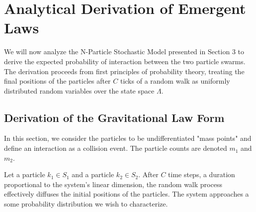 \documentclass[11pt, letterpaper]{article}
\begin{document}

\section{Analytical Derivation of Emergent Laws}

We will now analyze the N-Particle Stochastic Model presented in Section 3 to derive the expected probability of interaction between the two particle swarms. The derivation proceeds from first principles of probability theory, treating the final positions of the particles after $C$ ticks of a random walk as uniformly distributed random variables over the state space $\Lambda$.

\subsection{Derivation of the Gravitational Law Form}

In this section, we consider the particles to be undifferentiated "mass points" and define an interaction as a collision event. The particle counts are denoted $m_1$ and $m_2$.

Let a particle $k_1 \in S_1$ and a particle $k_2 \in S_2$. After $C$ time steps, a duration proportional to the system's linear dimension, the random walk process effectively diffuses the initial positions of the particles. The system approaches a some probability distribution we wish to characterize.
\end{document}
